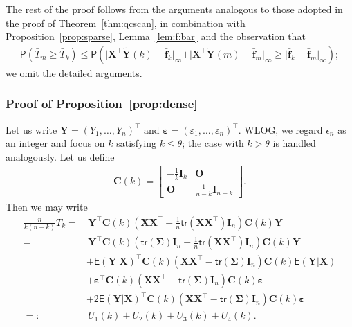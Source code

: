 \documentclass[11pt, a4paper]{article}
\newcommand{\mbf}{\mathbf}
\newcommand{\bmx}{\begin{bmatrix}}
\newcommand{\emx}{\end{bmatrix}}
\newcommand{\eps}{\epsilon}
\newcommand{\vep}{\varepsilon}
\renewcommand{\l}{\left}
\renewcommand{\r}{\right}
\def\wt{\widetilde}
\newcommand{\cp}{\theta}
\newcommand{\E}[0]{\mathsf{E}}
\newcommand{\tr}[0]{\mathsf{tr}}
\newcommand{\p}{\mathsf{P}}
\theoremstyle{definition}
\theoremstyle{definition}
\theoremstyle{definition}
\theoremstyle{definition}
\theoremstyle{definition}
\theoremstyle{remark}
\theoremstyle{definition}
\theoremstyle{definition}
\theoremstyle{definition}
\begin{document}
The rest of the proof follows from the arguments analogous to those adopted in the proof of Theorem~\ref{thm:qcscan}, in combination with Proposition~\ref{prop:sparse}, Lemma~\ref{lem:f:bar} and the observation that
\begin{align*}
\p\l( \bar{T}_m \ge \bar{T}_k \r) 
\le \p\l( \vert \mbf X^\top \wt{\mbf Y}(k) - \bar{\mbf f}_k \vert_\infty + \vert \mbf X^\top \wt{\mbf Y}(m) - \bar{\mbf f}_m \vert_\infty \ge
\vert \bar{\mbf f}_k - \bar{\mbf f}_m \vert_\infty \r);
\end{align*}
we omit the detailed arguments.

\subsubsection{Proof of Proposition~\ref{prop:dense}}

Let us write $\mbf Y = (Y_1, \ldots, Y_n)^\top$ and $\bm\vep = (\vep_1, \ldots, \vep_n)^\top$.
WLOG, we regard $\eps_n$ as an integer and focus on $k$ satisfying $k \le \cp$; the case with $k > \cp$ is handled analogously.
Let us define 
\begin{align*}
\mbf C(k) = \bmx - \frac{1}{k} \mbf I_k & \mbf O \\
\mbf O & \frac{1}{n - k} \mbf I_{n - k} \emx.
\end{align*}
Then we may write
\begin{align*}
\frac{n}{k(n - k)} T_k =& \, \mbf Y^\top \mbf C(k) \l( \mbf X\mbf X^\top - \frac{1}{n}\tr(\mbf X\mbf X^\top) \mbf I_n \r) \mbf C(k) \mbf Y
\\
= & \, \mbf Y^\top \mbf C(k) \l( \tr(\bm\Sigma) \mbf I_n - \frac{1}{n}\tr(\mbf X\mbf X^\top) \mbf I_n \r) \mbf C(k) \mbf Y
\\
& +  \E(\mbf Y \vert \mbf X)^\top \mbf C(k) \l( \mbf X\mbf X^\top - \tr(\bm\Sigma) \mbf I_n \r) \mbf C(k) \E(\mbf Y \vert \mbf X)
\\
& +  \bm\vep^\top \mbf C(k) \l( \mbf X\mbf X^\top - \tr(\bm\Sigma) \mbf I_n \r) \mbf C(k) \bm\vep
\\
& +  2 \E(\mbf Y \vert \mbf X)^\top \mbf C(k) \l( \mbf X\mbf X^\top - \tr(\bm\Sigma) \mbf I_n \r) \mbf C(k) \bm\vep 
\\
=: & \, U_1(k) + U_2(k) + U_3(k) + U_4(k).
\end{align*}
\end{document}
